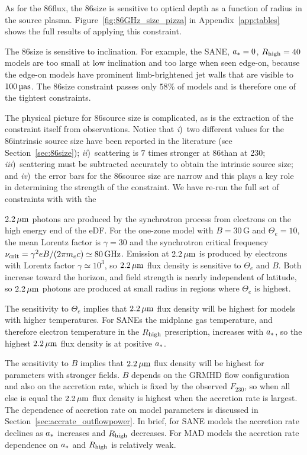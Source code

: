 As for the 86\GHz flux, the 86\GHz size is sensitive to optical depth as a function of radius in the source plasma.
Figure~\ref{fig:86GHz_size_pizza} in Appendix~\ref{app:tables} shows the full results of applying this constraint.

The 86\GHz size is sensitive to inclination.
For example, the SANE, $a_* = 0$, $R_\mathrm{high} = 40$ models are too small at low inclination and too large when seen edge-on, because the edge-on models have prominent limb-brightened jet walls that are visible to $100\uas$.
The 86\GHz size constraint passes only $58\%$ of models and is therefore one of the tightest constraints.

The physical picture for 86\GHz source size is complicated, as is the extraction of the constraint itself from observations.
Notice that
\emph{i})~two different values for the 86\GHz intrinsic source size have been reported in the literature (see Section~\ref{sec:86size});
\emph{ii})~scattering is $7$ times stronger at 86\GHz than at 230\GHz;
\emph{iii})~scattering must be subtracted accurately to obtain the intrinsic source size; and
\emph{iv})~the error bars for the 86\GHz source size are narrow and this plays a key role in determining the strength of the constraint.  We have re-run the full set of constraints with with the 


$2.2\,\mu\mathrm{m}$ photons are produced by the synchrotron process from electrons on the high energy end of the eDF.
For the one-zone model with $B = 30$\,G and $\Theta_e = 10$, the mean Lorentz factor is $\gamma = 30$ and the synchrotron critical frequency $\nu_\mathrm{crit} = \gamma^2 e B/(2 \pi m_e c) \simeq 80\,\mathrm{GHz}$.
Emission at $2.2\,\mu\mathrm{m}$ is produced by electrons with Lorentz factor $\gamma \simeq 10^3$, so $2.2\,\mu\mathrm{m}$ flux density is sensitive to $\Theta_e$ and $B$.
Both increase toward the horizon, and field strength is nearly independent of latitude, so $2.2\,\mu\mathrm{m}$ photons are produced at small radius in regions where $\Theta_e$ is highest.

The sensitivity to $\Theta_e$ implies that $2.2\,\mu\mathrm{m}$ flux density will be highest for models with higher temperatures.
For SANEs the midplane gas temperature, and therefore electron temperature in the $R_\mathrm{high}$ prescription, increases with $a_*$, so the highest $2.2\,\mu\mathrm{m}$ flux density is at positive $a_*$.

The sensitivity to $B$ implies that $2.2\,\mu\mathrm{m}$ flux density will be highest for parameters with stronger fields.  $B$ depends on the GRMHD flow configuration and also on the accretion rate, which is fixed by the observed $F_{230}$, so when all else is equal the $2.2\,\mu\mathrm{m}$ flux density is highest when the accretion rate is largest.  The dependence of accretion rate on model parameters is discussed in Section~\ref{sec:accrate_outflowpower}.  In brief, for SANE models the accretion rate declines as $a_*$ increases and $R_\mathrm{high}$ decreases. For MAD models the accretion rate dependence on $a_*$ and $R_\mathrm{high}$ is relatively weak.


